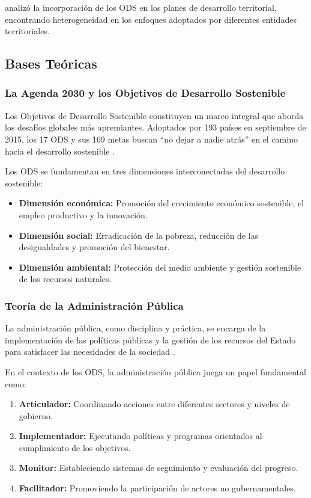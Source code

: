 \citet{grupo_investigacion_2020} analizó la incorporación de los ODS en los planes de desarrollo territorial, encontrando heterogeneidad en los enfoques adoptados por diferentes entidades territoriales.

\subsection{Bases Teóricas}

\subsubsection{La Agenda 2030 y los Objetivos de Desarrollo Sostenible}

Los Objetivos de Desarrollo Sostenible constituyen un marco integral que aborda los desafíos globales más apremiantes. Adoptados por 193 países en septiembre de 2015, los 17 ODS y sus 169 metas buscan ``no dejar a nadie atrás'' en el camino hacia el desarrollo sostenible \citep{naciones_unidas_2015}.

Los ODS se fundamentan en tres dimensiones interconectadas del desarrollo sostenible:

\begin{itemize}
    \item \textbf{Dimensión económica:} Promoción del crecimiento económico sostenible, el empleo productivo y la innovación.
    \item \textbf{Dimensión social:} Erradicación de la pobreza, reducción de las desigualdades y promoción del bienestar.
    \item \textbf{Dimensión ambiental:} Protección del medio ambiente y gestión sostenible de los recursos naturales.
\end{itemize}

\subsubsection{Teoría de la Administración Pública}

La administración pública, como disciplina y práctica, se encarga de la implementación de las políticas públicas y la gestión de los recursos del Estado para satisfacer las necesidades de la sociedad \citep{autor_administracion_2018}.

En el contexto de los ODS, la administración pública juega un papel fundamental como:

\begin{enumerate}
    \item \textbf{Articulador:} Coordinando acciones entre diferentes sectores y niveles de gobierno.
    \item \textbf{Implementador:} Ejecutando políticas y programas orientados al cumplimiento de los objetivos.
    \item \textbf{Monitor:} Estableciendo sistemas de seguimiento y evaluación del progreso.
    \item \textbf{Facilitador:} Promoviendo la participación de actores no gubernamentales.
\end{enumerate}

